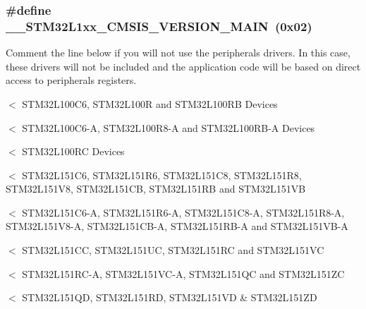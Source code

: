 \hypertarget{group___library__configuration__section_ga7b0deaa970bfbbe1145abd1cba8a5957}{
\subsubsection[{\-\_\-\-\_\-\-S\-T\-M32\-L1xx\-\_\-\-C\-M\-S\-I\-S\-\_\-\-V\-E\-R\-S\-I\-O\-N\-\_\-\-M\-A\-I\-N}]{\setlength{\rightskip}{0pt plus 5cm}\#define \-\_\-\-\_\-\-S\-T\-M32\-L1xx\-\_\-\-C\-M\-S\-I\-S\-\_\-\-V\-E\-R\-S\-I\-O\-N\-\_\-\-M\-A\-I\-N~(0x02)}}\label{group___library__configuration__section_ga7b0deaa970bfbbe1145abd1cba8a5957}


Comment the line below if you will not use the peripherals drivers. In this case, these drivers will not be included and the application code will be based on direct access to peripherals registers. 

$<$ S\-T\-M32\-L100\-C6, S\-T\-M32\-L100\-R and S\-T\-M32\-L100\-R\-B Devices

$<$ S\-T\-M32\-L100\-C6-\/\-A, S\-T\-M32\-L100\-R8-\/\-A and S\-T\-M32\-L100\-R\-B-\/\-A Devices

$<$ S\-T\-M32\-L100\-R\-C Devices

$<$ S\-T\-M32\-L151\-C6, S\-T\-M32\-L151\-R6, S\-T\-M32\-L151\-C8, S\-T\-M32\-L151\-R8, S\-T\-M32\-L151\-V8, S\-T\-M32\-L151\-C\-B, S\-T\-M32\-L151\-R\-B and S\-T\-M32\-L151\-V\-B

$<$ S\-T\-M32\-L151\-C6-\/\-A, S\-T\-M32\-L151\-R6-\/\-A, S\-T\-M32\-L151\-C8-\/\-A, S\-T\-M32\-L151\-R8-\/\-A, S\-T\-M32\-L151\-V8-\/\-A, S\-T\-M32\-L151\-C\-B-\/\-A, S\-T\-M32\-L151\-R\-B-\/\-A and S\-T\-M32\-L151\-V\-B-\/\-A

$<$ S\-T\-M32\-L151\-C\-C, S\-T\-M32\-L151\-U\-C, S\-T\-M32\-L151\-R\-C and S\-T\-M32\-L151\-V\-C

$<$ S\-T\-M32\-L151\-R\-C-\/\-A, S\-T\-M32\-L151\-V\-C-\/\-A, S\-T\-M32\-L151\-Q\-C and S\-T\-M32\-L151\-Z\-C

$<$ S\-T\-M32\-L151\-Q\-D, S\-T\-M32\-L151\-R\-D, S\-T\-M32\-L151\-V\-D \& S\-T\-M32\-L151\-Z\-D

